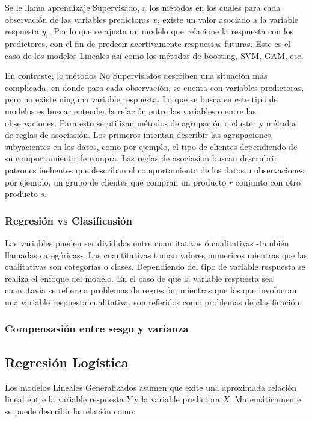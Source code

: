 \documentclass[a4paper,12pt]{Latex/Classes/PhDthesisPSnPDF}
\begin{document}
Se le llama aprendizaje Supervisado, a los métodos en los cuales para cada observación de las variables predictoras $x_{i}$ existe un valor asociado a la variable respuesta $y_{i}$. Por lo que se ajusta un modelo que relacione la respuesta con los predictores, con el fin de predecir acertivamente respuestas futuras. Este es el caso de los modelos Lineales así como los métodos de boosting, SVM, GAM, etc. 

En contraste, lo métodos No Supervisados describen una situación más complicada, en donde para cada observación, se cuenta con variables predictoras, pero no existe ninguna variable respuesta. Lo que se busca en este tipo de modelos es buscar entender la relación entre las variables o entre las observaciones. Para esto se utilizan métodos de agrupación o cluster y métodos de reglas de asociasión. Los primeros intentan describir las agrupaciones subyacientes en los datos, como por ejemplo, el tipo de clientes dependiendo de su comportamiento de compra. Las reglas de asociasion buscan descrubrir patrones inehentes que describan el comportamiento de los datos u observaciones, por ejemplo, un grupo de clientes que compran un producto $r$ conjunto con otro producto $s$.

\subsubsection{Regresión vs Clasificasión}

Las variables pueden ser divididas entre cuantitativas ó cualitativas -también llamadas categóricas-. Las cuantitativas toman valores numericos mientras que las cualitativas son categorías o clases. Dependiendo del tipo de variable respuesta se realiza el enfoque del modelo. En el caso de que la variable respuesta sea cuantitavia se refiere a problemas de regresión, mientras que los que involucran una variable respuesta cualitativa, son referidos como problemas de clasificación.

\subsubsection{Compensasión entre sesgo y varianza}


\subsection{Regresión Logística}

Los modelos Lineales Generalizados asumen que exite una aproximada relación lineal entre la variable respuesta $Y$ y la variable predictora $X$. Matemáticamente se puede describir la relación como:
\end{document}
